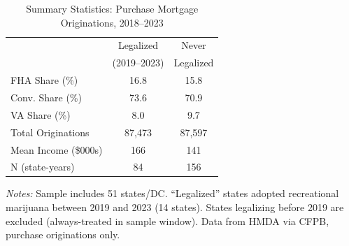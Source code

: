 \begin{table}[t]
\centering
\caption{Summary Statistics: Purchase Mortgage Originations, 2018--2023}
\label{tab:summary}
\begin{tabular}{lcc}
\hline\hline
 & Legalized & Never \\
 & (2019--2023) & Legalized \\
\hline
FHA Share (\%) & 16.8 & 15.8 \\
Conv. Share (\%) & 73.6 & 70.9 \\
VA Share (\%) & 8.0 & 9.7 \\
Total Originations & 87,473 & 87,597 \\
Mean Income (\$000s) & 166 & 141 \\
N (state-years) & 84 & 156 \\
\hline\hline
\end{tabular}
\begin{tablenotes}
\small
\item \textit{Notes:} Sample includes 51 states/DC. ``Legalized'' states adopted recreational marijuana between 2019 and 2023 (14 states). States legalizing before 2019 are excluded (always-treated in sample window). Data from HMDA via CFPB, purchase originations only.
\end{tablenotes}
\end{table}
